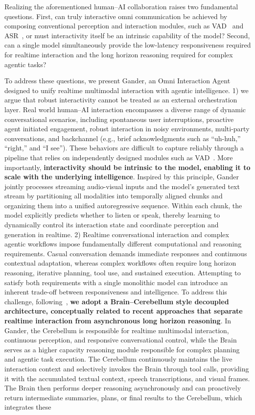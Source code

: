 Realizing the aforementioned human–AI collaboration raises two fundamental questions. First, can truly interactive omni communication be achieved by composing conventional perception and interaction modules, such as VAD~\cite{xu2026fireredasr2s} and ASR~\cite{whisper,funasr}, or must interactivity itself be an intrinsic capability of the model? Second, can a single model simultaneously provide the low-latency responsiveness required for realtime interaction and the long horizon reasoning required for complex agentic tasks? 


To address these questions, we present Gander, an Omni Interaction Agent designed to unify realtime multimodal interaction with agentic intelligence. 1) we argue that robust interactivity cannot be treated as an external orchestration layer. Real world human–AI interaction encompasses a diverse range of dynamic conversational scenarios, including spontaneous user interruptions, proactive agent initiated engagement, robust interaction in noisy environments, multi-party conversations, and backchannel (e.g., brief acknowledgments such as “uh-huh,” “right,” and “I see”). These behaviors are difficult to capture reliably through a pipeline that relies on independently designed modules such as VAD~\cite{SileroVAD}. More importantly, \textbf{interactivity should be intrinsic to the model, enabling it to scale with the underlying intelligence}. Inspired by this principle, Gander jointly processes streaming audio-visual inputs and the model’s generated text stream by partitioning all modalities into temporally aligned chunks and organizing them into a unified autoregressive sequence. Within each chunk, the model explicitly predicts whether to listen or speak, thereby learning to dynamically control its interaction state and coordinate perception and generation in realtime. 2) Realtime conversational interaction and complex agentic workflows impose fundamentally different computational and reasoning requirements. Casual conversation demands immediate responses and continuous contextual adaptation, whereas complex workflows often require long horizon reasoning, iterative planning, tool use, and sustained execution. Attempting to satisfy both requirements with a single monolithic model can introduce an inherent trade-off between responsiveness and intelligence. To address this challenge, following~\cite{thinkingmachines2026interactionmodels, huang2026duplexomni,Mind-paced-speaking}, \textbf{we adopt a Brain–Cerebellum style decoupled architecture, conceptually related to recent approaches that separate realtime interaction from asynchronous long horizon reasoning}. In Gander, the Cerebellum is responsible for realtime multimodal interaction, continuous perception, and responsive conversational control, while the Brain serves as a higher capacity reasoning module responsible for complex planning and agentic task execution. The Cerebellum continuously maintains the live interaction context and selectively invokes the Brain through tool calls, providing it with the accumulated textual context, speech transcriptions, and visual frames. The Brain then performs deeper reasoning asynchronously and can proactively return intermediate summaries, plans, or final results to the Cerebellum, which integrates these 
